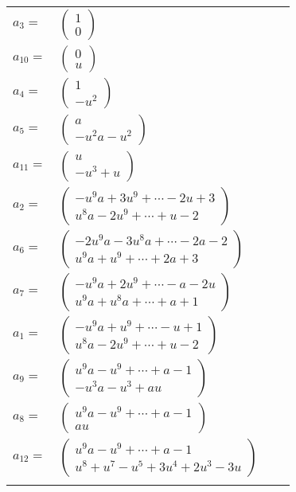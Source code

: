 \documentclass[1p]{elsarticle_modified}
\theoremstyle{definition}
\begin{document}
\begin{tabular}{m{7pt} m{180pt} m{7pt} m{180pt} }
\flushright $a_{3}=$&$\begin{pmatrix}1\\0\end{pmatrix}$ \\
\flushright $a_{10}=$&$\begin{pmatrix}0\\u\end{pmatrix}$ \\
\flushright $a_{4}=$&$\begin{pmatrix}1\\- u^2\end{pmatrix}$ \\
\flushright $a_{5}=$&$\begin{pmatrix}a\\- u^2 a- u^2\end{pmatrix}$ \\
\flushright $a_{11}=$&$\begin{pmatrix}u\\- u^3+u\end{pmatrix}$ \\
\flushright $a_{2}=$&$\begin{pmatrix}- u^9 a+3 u^9+\cdots-2 u+3\\u^8 a-2 u^9+\cdots+u-2\end{pmatrix}$ \\
\flushright $a_{6}=$&$\begin{pmatrix}-2 u^9 a-3 u^8 a+\cdots-2 a-2\\u^9 a+u^9+\cdots+2 a+3\end{pmatrix}$ \\
\flushright $a_{7}=$&$\begin{pmatrix}- u^9 a+2 u^9+\cdots- a-2 u\\u^9 a+u^8 a+\cdots+a+1\end{pmatrix}$ \\
\flushright $a_{1}=$&$\begin{pmatrix}- u^9 a+u^9+\cdots- u+1\\u^8 a-2 u^9+\cdots+u-2\end{pmatrix}$ \\
\flushright $a_{9}=$&$\begin{pmatrix}u^9 a- u^9+\cdots+a-1\\- u^3 a- u^3+a u\end{pmatrix}$ \\
\flushright $a_{8}=$&$\begin{pmatrix}u^9 a- u^9+\cdots+a-1\\a u\end{pmatrix}$ \\
\flushright $a_{12}=$&$\begin{pmatrix}u^9 a- u^9+\cdots+a-1\\u^8+u^7- u^5+3 u^4+2 u^3-3 u\end{pmatrix}$\\&\end{tabular}
\end{document}
